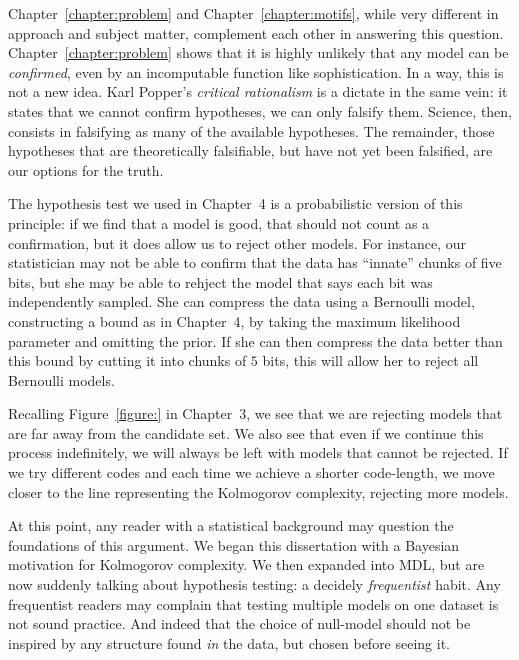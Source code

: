 Chapter~\ref{chapter:problem} and Chapter~\ref{chapter:motifs}, while very different in approach and subject matter, complement each other in answering this question. Chapter~\ref{chapter:problem} shows that it is highly unlikely that any model can be \emph{confirmed}, even by an incomputable function like sophistication. In a way, this is not a new idea. Karl Popper's \emph{critical rationalism} is a dictate in the same vein: it states that we cannot confirm hypotheses, we can only falsify them. Science, then, consists in falsifying as many of the available hypotheses. The remainder, those hypotheses that are theoretically falsifiable, but have not yet been falsified, are our options for the truth.

The hypothesis test we used in Chapter~4 is a probabilistic version of this principle: if we find that a model is good, that should not count as a confirmation, but it does allow us to reject other models. For instance, our statistician may not be able to confirm that the data has ``innate'' chunks of five bits, but she may be able to rehject the model that says each bit was independently sampled. She can compress the data using a Bernoulli model, constructing a bound as in Chapter~4, by taking the maximum likelihood parameter and omitting the prior. If she can then compress the data better than this bound by cutting it into chunks of $5$ bits, this will allow her to reject all Bernoulli models.

Recalling Figure~\ref{figure:} in Chapter~3, we see that we are rejecting models that are far away from the candidate set. We also see that even if we continue this process indefinitely, we will always be left with models that cannot be rejected. If we try different codes and each time we achieve a shorter code-length, we move closer to the line representing the Kolmogorov complexity, rejecting more models.

At this point, any reader with a statistical background may question the foundations of this argument. We began this dissertation with a Bayesian motivation for Kolmogorov complexity. We then expanded into MDL, but are now suddenly talking about hypothesis testing: a decidely \emph{frequentist} habit. Any frequentist readers may complain that testing multiple models on one dataset is not sound practice. And indeed that the choice of null-model should not be inspired by any structure found \emph{in} the data, but chosen before seeing it.


